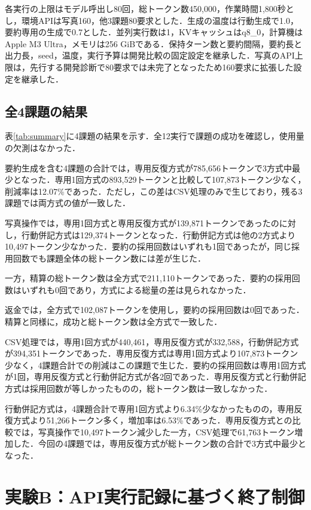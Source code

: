 \documentclass[letter]{ieicej}
\begin{document}
各実行の上限はモデル呼出し80回，総トークン数450,000，作業時間1,800秒とし，環境APIは写真160，他3課題80要求とした．生成の温度は行動生成で1.0，要約専用の生成で0.7とした．並列実行数は1，KVキャッシュはq8\_0，計算機はApple M3 Ultra，メモリは256 GiBである．保持ターン数と要約間隔，要約長と出力長，seed，温度，実行予算は開発比較の固定設定を継承した．写真のAPI上限は，先行する開発診断で80要求では未完了となったため160要求に拡張した設定を継承した．

\subsection{全4課題の結果}

表\ref{tab:summary}に4課題の結果を示す．全12実行で課題の成功を確認し，使用量の欠測はなかった．

\SummaryResultsTable

要約生成を含む4課題の合計では，専用反復方式が785,656トークンで3方式中最少となった．専用1回方式の893,529トークンと比較して107,873トークン少なく，削減率は12.07\%であった．ただし，この差はCSV処理のみで生じており，残る3課題では両方式の値が一致した．

写真操作では，専用1回方式と専用反復方式が139,871トークンであったのに対し，行動併記方式は129,374トークンとなった．行動併記方式は他の2方式より10,497トークン少なかった．要約の採用回数はいずれも1回であったが，同じ採用回数でも課題全体の総トークン数には差が生じた．

一方，精算の総トークン数は全方式で211,110トークンであった．要約の採用回数はいずれも0回であり，方式による総量の差は見られなかった．

返金では，全方式で102,087トークンを使用し，要約の採用回数は0回であった．精算と同様に，成功と総トークン数は全方式で一致した．

CSV処理では，専用1回方式が440,461，専用反復方式が332,588，行動併記方式が394,351トークンであった．専用反復方式は専用1回方式より107,873トークン少なく，4課題合計での削減はこの課題で生じた．要約の採用回数は専用1回方式が1回，専用反復方式と行動併記方式が各2回であった．専用反復方式と行動併記方式は採用回数が等しかったものの，総トークン数は一致しなかった．

行動併記方式は，4課題合計で専用1回方式より6.34\%少なかったものの，専用反復方式より51,266トークン多く，増加率は6.53\%であった．専用反復方式との比較では，写真操作で10,497トークン減少した一方，CSV処理で61,763トークン増加した．今回の4課題では，専用反復方式が総トークン数の合計で3方式中最少となった．

\section{実験B：API実行記録に基づく終了制御}
\end{document}
